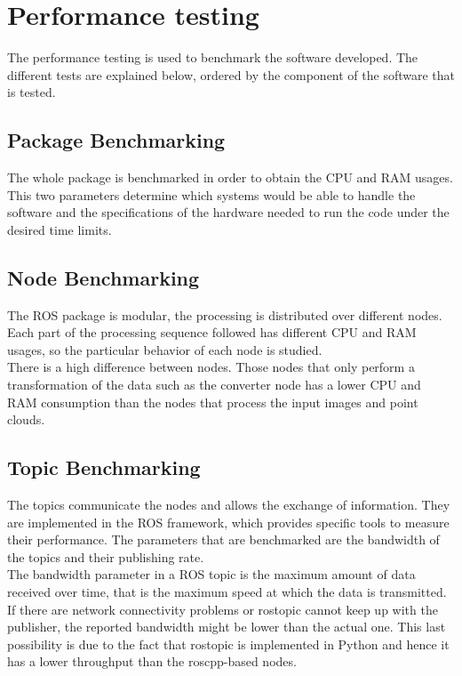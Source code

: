 \chapter{Performance testing}
The performance testing is used to benchmark the software developed. The different tests are explained below, ordered by the component of the software that is tested. 


\section{Package Benchmarking}
The whole package is benchmarked in order to obtain the CPU and RAM usages. This two parameters determine which systems would be able to handle the software and the specifications of the hardware needed to run the code under the desired time limits. 

\section{Node Benchmarking}
The ROS package is modular, the processing is distributed over different nodes. Each part of the processing sequence followed has different CPU and RAM usages, so the particular behavior of each node is studied. 
\\

There is a high difference between nodes. Those nodes that only perform a transformation of the data such as the converter node has a lower CPU and RAM consumption than the nodes that process the input images and point clouds. 

\section{Topic Benchmarking}
The topics communicate the nodes and allows the exchange of information. They are implemented in the ROS framework, which provides specific tools to measure their performance.
The parameters that are benchmarked are the bandwidth of the topics and their publishing rate.\\

The bandwidth parameter in a ROS topic is the maximum amount of data received over time, that is the maximum speed at which the data is transmitted. If there are network connectivity problems or rostopic cannot keep up with the publisher, the reported bandwidth might be lower than the actual one. This last possibility is due to the fact that rostopic is implemented in Python and hence it has a lower throughput than the roscpp-based nodes. 



